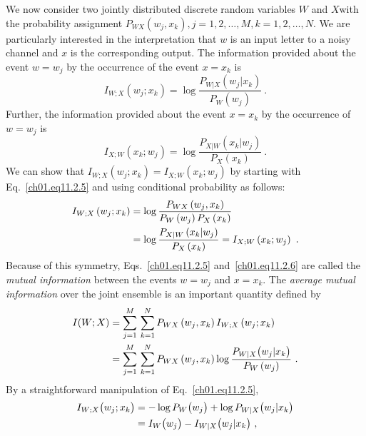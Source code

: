 We now consider two jointly distributed discrete random variables $W$ and
$X$with the probability assignment
$P_{WX} (w_j, x_k), j = 1,2,\dots, M, k = 1,2,\dots, N$.
We are particularly interested in the interpretation that $w$ is an
input letter to a noisy channel and $x$ is the corresponding output.
The information provided about the event $w=w_j$ by the occurrence of the
event $x=x_k$ is
\begin{equation}
 I_{W;X} \left(w_j;x_k\right)
   = \log \frac{P_{W|X} \left(w_j|x_k\right)} {P_W \left(w_j\right)}~.
\label{ch01.eq11.2.5}
\end{equation}
Further, the information provided about the event $x=x_k$ by the occurrence of
$w= w_j$ is
\begin{equation}
 I_{X ; W} \left( x_k; w_j \right) =\log
  \frac{P_{X|W} \left( x_k| w_j\right)}  {P_X \left(x_k\right)} ~.
\label{ch01.eq11.2.6}
\end{equation}
We can show that $ I_{W;X}(w_j;x_k) =  I_{X;W}(x_k; w_j)$ by starting with
Eq.~\eqref{ch01.eq11.2.5} and using conditional probability as follows:
\begin{align}
    I_{W;X}\left(w_j;x_k\right)
    & = \log
    \frac{P_{WX}\left(w_j, x_k\right)}{P_W\left(w_j\right)
              P_X\left(x_k\right)}
    \notag\\
    & = \log
    \frac{P_{X|W} \left( x_k | w_j\right)} {P_X \left(x_k\right)}
    =
     I_{X;W} \left(x_k; w_j\right) ~.
\label{ch01.eq11.2.7}
\end{align}
Because of this symmetry,
Eqs.~\eqref{ch01.eq11.2.5} and~\eqref{ch01.eq11.2.6}
are called  the \textit{mutual information}
between the events $w= w_j $ and $x= x_k$.
The \textit{average mutual information}
over the joint ensemble is an important quantity defined by
\begin{align}
 I(W;X) & \displaystyle = \sum^M_{j=1} \, \sum^N_{k=1} P_{WX}
 \left(w_j, x_k\right) I_{W;X} \left(w_j; x_k\right)
 \notag\\
 &\displaystyle = \sum^M_{j=1} \, \sum^N_{k=1} P_{WX}
 \left(w_j, x_k\right) \log
 \frac{ P_{W |X} \big(w_j |  x_k\big)}{P_W\left(w_j\right)}~.
\label{ch01.eq11.2.8}
\end{align}
By a straightforward manipulation of Eq.~\eqref{ch01.eq11.2.5},
\begin{align}
 I_{W;X} \big(w_j;x_k\big) & = - \log P_W \big(w_j\big) +
 \log P_{W|X} \big(w_j|x_k\big)
 \notag\\
 & =  I_W \big(w_j\big) - I_{W|X} \big(w_j| x_k\big)~,
\label{ch01.eq11.2.9}
\end{align}
